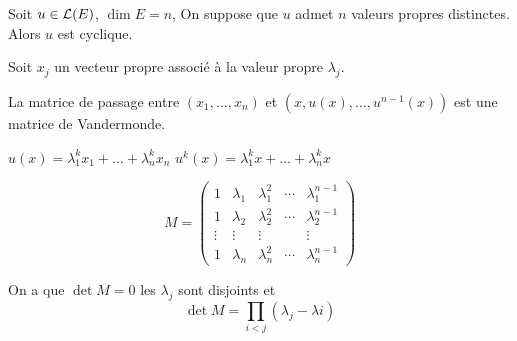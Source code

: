\begin{example}
	Soit $u \in \mathcal{L}(E)$, $\dim E = n$, On suppose que $u$ admet $n$ valeurs propres distinctes. Alors $u$ est cyclique.

	Soit $x_j$ un vecteur propre associé à la valeur propre $\lambda_j$.

	La matrice de passage entre $(x_1, \dots, x_n)$ et $(x, u(x), \dots, u^{n-1}(x))$ est une matrice de Vandermonde.

	$u(x) = \lambda_1^k x_1 + \dots + \lambda_n^{k}x_n$
	$u^k(x) = \lambda_1^k x + \dots + \lambda_n^{k}x$

	\begin{equation*}
		M = \begin{pmatrix}
			1      & \lambda_1 & \lambda_1^2 & \cdots & \lambda_1^{n-1} \\
			1      & \lambda_2 & \lambda_2^2 & \cdots & \lambda_2^{n-1} \\
			\vdots & \vdots    & \vdots      &        & \vdots          \\
			1      & \lambda_n & \lambda_n^2 & \cdots & \lambda_n^{n-1}
		\end{pmatrix}
	\end{equation*}

	On a que $\det M = 0 $ \ssi les $\lambda_j$ sont disjoints et
	$$ \det M = \prod_{i < j} (\lambda_j-\lambda i)$$
\end{example}
